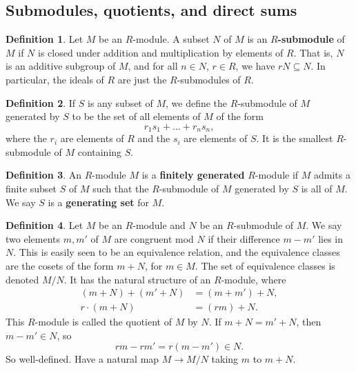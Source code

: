 \documentclass{article}
\newcommand{\rb}[1]{\left( #1 \right)}
\theoremstyle{definition}\newtheorem{definition}{Definition}[subsection]
\theoremstyle{definition}\newtheorem{remark}[definition]{Remark}
\theoremstyle{definition}\newtheorem*{example}{Example}
\theoremstyle{definition}\newtheorem*{note}{Note}
\begin{document}
\subsection{Submodules, quotients, and direct sums}

\begin{definition}
Let $ M $ be an $ R $-module. A subset $ N $ of $ M $ is an \textbf{$ R $-submodule} of $ M $ if $ N $ is closed under addition and multiplication by elements of $ R $. That is, $ N $ is an additive subgroup of $ M $, and for all $ n \in N $, $ r \in R $, we have $ rN \subseteq N $. In particular, the ideals of $ R $ are just the $ R $-submodules of $ R $.
\end{definition}

\begin{definition}
If $ S $ is any subset of $ M $, we define the $ R $-submodule of $ M $ generated by $ S $ to be the set of all elements of $ M $ of the form
$$ r_1s_1 + \dots + r_ns_n, $$
where the $ r_i $ are elements of $ R $ and the $ s_i $ are elements of $ S $. It is the smallest $ R $-submodule of $ M $ containing $ S $.
\end{definition}

\begin{definition}
An $ R $-module $ M $ is a \textbf{finitely generated} $ R $-module if $ M $ admits a finite subset $ S $ of $ M $ such that the $ R $-submodule of $ M $ generated by $ S $ is all of $ M $. We say $ S $ is a \textbf{generating set} for $ M $.
\end{definition}

\begin{definition}
Let $ M $ be an $ R $-module and $ N $ be an $ R $-submodule of $ M $. We say two elements $ m, m' $ of $ M $ are congruent mod $ N $ if their difference $ m - m' $ lies in $ N $. This is easily seen to be an equivalence relation, and the equivalence classes are the cosets of the form $ m + N $, for $ m \in M $. The set of equivalence classes is denoted $ M / N $. It has the natural structure of an $ R $-module, where
\begin{align*}
\rb{m + N} + \rb{m' + N} & = \rb{m + m'} + N, \\
r \cdot \rb{m + N} & = \rb{rm} + N.
\end{align*}
This $ R $-module is called the quotient of $ M $ by $ N $. If $ m + N = m' + N $, then $ m - m' \in N $, so
$$ rm - rm' = r\rb{m - m'} \in N. $$
So well-defined. Have a natural map $ M \to M / N $ taking $ m $ to $ m + N $.
\end{definition}
\end{document}
